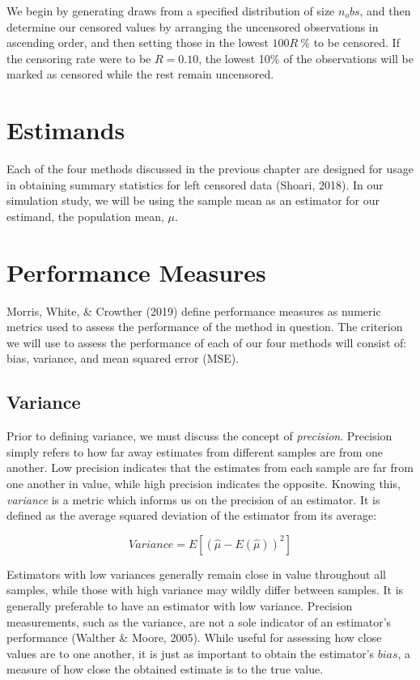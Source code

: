 \documentclass[12pt, twoside]{amherstthesis}
\begin{document}
We begin by generating draws from a specified distribution of size \(n_obs\), and then determine our censored values by arranging the uncensored observations in ascending order, and then setting those in the lowest \(100R \ \%\) to be censored. If the censoring rate were to be \(R = 0.10\), the lowest 10\% of the observations will be marked as censored while the rest remain uncensored.

\newpage

\hypertarget{estimands}{%
\section{Estimands}\label{estimands}}

Each of the four methods discussed in the previous chapter are designed for usage in obtaining summary statistics for left censored data (Shoari, 2018). In our simulation study, we will be using the sample mean as an estimator for our estimand, the population mean, \(\mu\).

\hypertarget{performance_measures}{%
\section{Performance Measures}\label{performance_measures}}

Morris, White, \& Crowther (2019) define performance measures as numeric metrics used to assess the performance of the method in question. The criterion we will use to assess the performance of each of our four methods will consist of: bias, variance, and mean squared error (MSE).

\hypertarget{variance}{%
\subsection{Variance}\label{variance}}

Prior to defining variance, we must discuss the concept of \emph{precision}. Precision simply refers to how far away estimates from different samples are from one another. Low precision indicates that the estimates from each sample are far from one another in value, while high precision indicates the opposite. Knowing this, \emph{variance} is a metric which informs us on the precision of an estimator. It is defined as the average squared deviation of the estimator from its average:

\[Variance = E[(\hat{\mu}-E(\hat{\mu}))^2]\]

Estimators with low variances generally remain close in value throughout all samples, while those with high variance may wildly differ between samples. It is generally preferable to have an estimator with low variance. Precision measurements, such as the variance, are not a sole indicator of an estimator's performance (Walther \& Moore, 2005). While useful for assessing how close values are to one another, it is just as important to obtain the estimator's \(bias\), a measure of how close the obtained estimate is to the true value.
\end{document}
